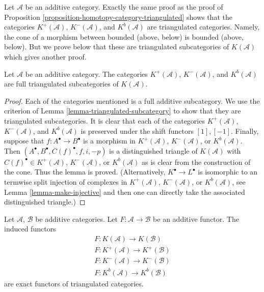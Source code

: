 \begin{remark}
\label{remark-boundedness-conditions-triangulated}
Let $\mathcal{A}$ be an additive category.
Exactly the same proof as the proof of
Proposition \ref{proposition-homotopy-category-triangulated}
shows that the categories
$K^{+}(\mathcal{A})$, $K^{-}(\mathcal{A})$, and $K^b(\mathcal{A})$
are triangulated categories. Namely, the cone of a morphism between
bounded (above, below) is bounded (above, below).
But we prove below that these are triangulated subcategories
of $K(\mathcal{A})$ which gives another proof.
\end{remark}

\begin{lemma}
\label{lemma-bounded-triangulated-subcategories}
Let $\mathcal{A}$ be an additive category. The categories
$K^{+}(\mathcal{A})$, $K^{-}(\mathcal{A})$, and $K^b(\mathcal{A})$
are full triangulated subcategories of $K(\mathcal{A})$.
\end{lemma}

\begin{proof}
Each of the categories mentioned is a full additive subcategory.
We use the criterion of
Lemma \ref{lemma-triangulated-subcategory}
to show that they are triangulated subcategories.
It is clear that each of the categories
$K^{+}(\mathcal{A})$, $K^{-}(\mathcal{A})$, and $K^b(\mathcal{A})$
is preserved under the shift functors $[1], [-1]$.
Finally, suppose that $f : A^\bullet \to B^\bullet$ is a morphism
in $K^{+}(\mathcal{A})$, $K^{-}(\mathcal{A})$, or $K^b(\mathcal{A})$.
Then $(A^\bullet, B^\bullet, C(f)^\bullet, f, i, -p)$ is a distinguished
triangle of $K(\mathcal{A})$ with $C(f)^\bullet \in K^{+}(\mathcal{A})$,
$K^{-}(\mathcal{A})$, or $K^b(\mathcal{A})$ as is clear from the construction
of the cone. Thus the lemma is proved. (Alternatively,
$K^\bullet \to L^\bullet$ is isomorphic to an termwise split injection
of complexes in $K^{+}(\mathcal{A})$, $K^{-}(\mathcal{A})$, or
$K^b(\mathcal{A})$, see
Lemma \ref{lemma-make-injective}
and then one can directly take the associated
distinguished triangle.)
\end{proof}

\begin{lemma}
\label{lemma-additive-exact-homotopy-category}
Let $\mathcal{A}$, $\mathcal{B}$ be additive categories.
Let $F : \mathcal{A} \to \mathcal{B}$ be an additive functor.
The induced functors
$$
\begin{matrix}
F : K(\mathcal{A}) \longrightarrow K(\mathcal{B}) \\
F : K^{+}(\mathcal{A}) \longrightarrow K^{+}(\mathcal{B}) \\
F : K^{-}(\mathcal{A}) \longrightarrow K^{-}(\mathcal{B}) \\
F : K^b(\mathcal{A}) \longrightarrow K^b(\mathcal{B})
\end{matrix}
$$
are exact functors of triangulated categories.
\end{lemma}

